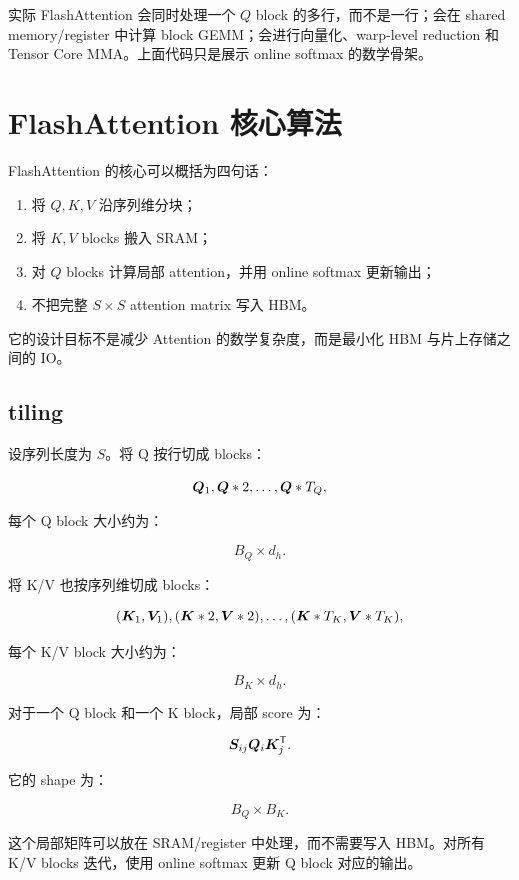 实际 FlashAttention 会同时处理一个 $Q$ block 的多行，而不是一行；会在 shared memory/register 中计算 block GEMM；会进行向量化、warp-level reduction 和 Tensor Core MMA。上面代码只是展示 online softmax 的数学骨架。

\section{FlashAttention 核心算法}
\label{sec:flashattention-core-algorithm}

FlashAttention 的核心可以概括为四句话：

\begin{enumerate}
\item 将 $Q,K,V$ 沿序列维分块；
\item 将 $K,V$ blocks 搬入 SRAM；
\item 对 $Q$ blocks 计算局部 attention，并用 online softmax 更新输出；
\item 不把完整 $S\times S$ attention matrix 写入 HBM。
\end{enumerate}

它的设计目标不是减少 Attention 的数学复杂度，而是最小化 HBM 与片上存储之间的 IO。

\subsection{tiling}
\label{subsec:flashattention-tiling}

设序列长度为 $S$。将 Q 按行切成 blocks：

\[
\bm{Q}_1,\bm{Q}*2,\ldots,\bm{Q}*{T_Q},
\]

每个 Q block 大小约为：

\[
B_Q\times d_h.
\]

将 K/V 也按序列维切成 blocks：

\[
(\bm{K}_1,\bm{V}_1),
(\bm{K}*2,\bm{V}*2),
\ldots,
(\bm{K}*{T_K},\bm{V}*{T_K}),
\]

每个 K/V block 大小约为：

\[
B_K\times d_h.
\]

对于一个 Q block 和一个 K block，局部 score 为：

\[
\bm{S}_{ij}
\bm{Q}_i\bm{K}_j^{\mathsf{T}}.
\]

它的 shape 为：

\[
B_Q\times B_K.
\]

这个局部矩阵可以放在 SRAM/register 中处理，而不需要写入 HBM。对所有 K/V blocks 迭代，使用 online softmax 更新 Q block 对应的输出。


